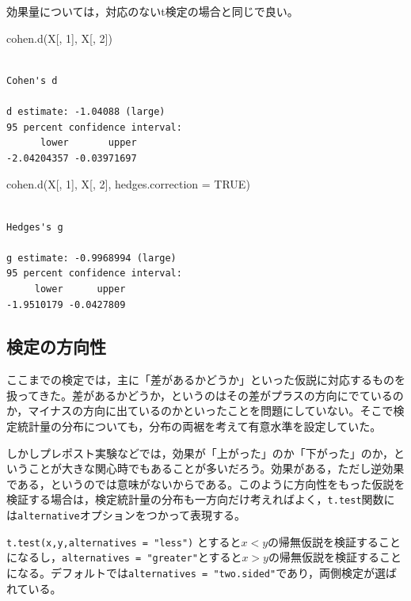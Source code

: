 \documentclass[
  a4paper,
]{ltjsbook}
\newenvironment{Shaded}{\begin{snugshade}}{\end{snugshade}}
\newcommand{\AttributeTok}[1]{\textcolor[rgb]{0.40,0.45,0.13}{#1}}
\newcommand{\ConstantTok}[1]{\textcolor[rgb]{0.56,0.35,0.01}{#1}}
\newcommand{\DecValTok}[1]{\textcolor[rgb]{0.68,0.00,0.00}{#1}}
\newcommand{\FunctionTok}[1]{\textcolor[rgb]{0.28,0.35,0.67}{#1}}
\newcommand{\NormalTok}[1]{\textcolor[rgb]{0.00,0.23,0.31}{#1}}
\begin{document}
効果量については，対応のないt検定の場合と同じで良い。

\begin{Shaded}
\begin{Highlighting}[]
\FunctionTok{cohen.d}\NormalTok{(X[, }\DecValTok{1}\NormalTok{], X[, }\DecValTok{2}\NormalTok{])}
\end{Highlighting}
\end{Shaded}

\begin{verbatim}

Cohen's d

d estimate: -1.04088 (large)
95 percent confidence interval:
      lower       upper 
-2.04204357 -0.03971697 
\end{verbatim}

\begin{Shaded}
\begin{Highlighting}[]
\FunctionTok{cohen.d}\NormalTok{(X[, }\DecValTok{1}\NormalTok{], X[, }\DecValTok{2}\NormalTok{], }\AttributeTok{hedges.correction =} \ConstantTok{TRUE}\NormalTok{)}
\end{Highlighting}
\end{Shaded}

\begin{verbatim}

Hedges's g

g estimate: -0.9968994 (large)
95 percent confidence interval:
     lower      upper 
-1.9510179 -0.0427809 
\end{verbatim}

\subsection{検定の方向性}\label{ux691cux5b9aux306eux65b9ux5411ux6027}

ここまでの検定では，主に「差があるかどうか」といった仮説に対応するものを扱ってきた。差があるかどうか，というのはその差がプラスの方向にでているのか，マイナスの方向に出ているのかといったことを問題にしていない。そこで検定統計量の分布についても，分布の両裾を考えて有意水準を設定していた。

しかしプレポスト実験などでは，効果が「上がった」のか「下がった」のか，ということが大きな関心時でもあることが多いだろう。効果がある，ただし逆効果である，というのでは意味がないからである。このように方向性をもった仮説を検証する場合は，検定統計量の分布も一方向だけ考えればよく，\texttt{t.test}関数には\texttt{alternative}オプションをつかって表現する。

\texttt{t.test(x,y,alternatives\ =\ "less")}
とすると\(x < y\)の帰無仮説を検証することになるし，\texttt{alternatives\ =\ "greater"}とすると\(x > y\)の帰無仮説を検証することになる。デフォルトでは\texttt{alternatives\ =\ "two.sided"}であり，両側検定が選ばれている。
\end{document}
